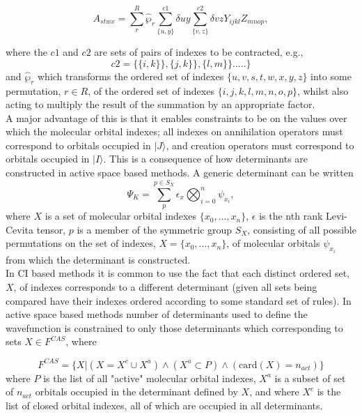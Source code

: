 \documentclass[12pt]{article}
\begin{document}
\begin{equation*}
A_{stwx} = \sum_{r}^{R}\hat{\wp}_{r}\sum^{c1}_{\{u,y\}}\delta{uy}\sum^{c2}_{\{v,z\}} \delta{vz}Y_{ijkl}Z_{mnop},
\end{equation*}

where the $c1$ and $c2$ are sets of pairs of indexes to be contracted, e.g.,
\begin{equation}
c2 = \{ \{i, k\} \} , \{j, k\} \} ,\{l, m\} \}.....\} 
\end{equation}
and $\hat{\wp}_{r}$ which transforms the ordered set of indexes
$\{u,v,s,t,w,x,y,z\}$ into some permutation, $r\in R$, of the ordered set of
indexes $\{i,j,k,l,m,n,o,p\}$, whilst also acting to multiply the result of the
summation by an appropriate factor.\\

\noindent A major advantage of this is that it enables constraints to be
on the values over which the molecular orbital indexes; all indexes on 
annihilation operators must correspond to orbitals occupied in $|J\rangle$, and 
creation operators must correspond to orbitals occupied in $|I\rangle$. 
This is a consequence of how determinants are constructed in 
active space based methods. A generic determinant can be written
\begin{equation}
\Psi_{K} = \sum^{p\in S_{X}}_{p} \epsilon_{x} \bigotimes_{i=0}^{n}  \psi_{x_{i}},
\end{equation}
where $X$ is a set of molecular orbital indexes $\{x_{0},...,x_{n}\}$,
$\epsilon$ is the nth rank Levi-Cevita
tensor, $p$ is a member of the symmetric group $S_{X}$,
consisting of all possible permutations on the set of indexes,
$X = \{x_{0},...,x_{n}\}$, of molecular orbitals $\psi_{x_{i}}$ from which the
determinant is constructed.\\

\noindent In CI based methods it is common to use the fact that 
each distinct ordered set, $X$, of indexes corresponds to a different 
determinant (given all sets being compared have their indexes ordered according
to some standard set of rules). In active space based methods number of
determinants used to define the wavefunction is constrained to only
those determinants which corresponding to sets $X \in {F^{CAS}}$, where

\begin{equation*}
F^{CAS} = \{ X | (X = X^{c} \cup X^{a}) \wedge (X^{a} \subset P) \wedge ( \text{card}(X) = n_{act} )  \}
\end{equation*}
where $P$ is the list of all "active" molecular orbital indexes, 
$X^{a}$ is a subset of set of $n_{act}$ orbitals occupied in the determinant defined by $X$, and
where $X^{c}$ is the list of closed orbital indexes, all of which are occupied in all determinants.\\
\end{document}
